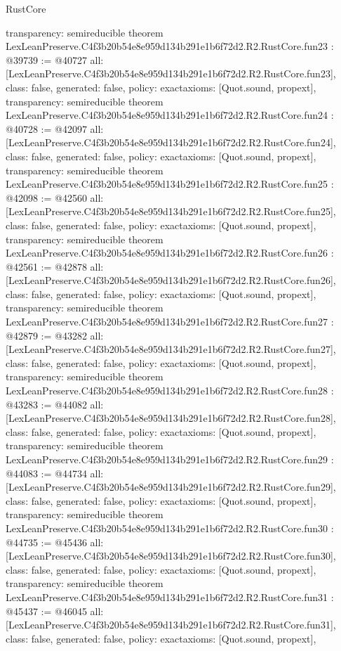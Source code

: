 \begin{lexlean}{RustCore}
\begin{coremodule}
{  transparency: semireducible
}
theorem LexLeanPreserve.C4f3b20b54e8e959d134b291e1b6f72d2.R2.RustCore.fun23 : @39739 := @40727 {
  all: [LexLeanPreserve.C4f3b20b54e8e959d134b291e1b6f72d2.R2.RustCore.fun23],
  class: false,
  generated: false,
  policy: exact{axioms: [Quot.sound, propext]},
  transparency: semireducible
}
theorem LexLeanPreserve.C4f3b20b54e8e959d134b291e1b6f72d2.R2.RustCore.fun24 : @40728 := @42097 {
  all: [LexLeanPreserve.C4f3b20b54e8e959d134b291e1b6f72d2.R2.RustCore.fun24],
  class: false,
  generated: false,
  policy: exact{axioms: [Quot.sound, propext]},
  transparency: semireducible
}
theorem LexLeanPreserve.C4f3b20b54e8e959d134b291e1b6f72d2.R2.RustCore.fun25 : @42098 := @42560 {
  all: [LexLeanPreserve.C4f3b20b54e8e959d134b291e1b6f72d2.R2.RustCore.fun25],
  class: false,
  generated: false,
  policy: exact{axioms: [Quot.sound, propext]},
  transparency: semireducible
}
theorem LexLeanPreserve.C4f3b20b54e8e959d134b291e1b6f72d2.R2.RustCore.fun26 : @42561 := @42878 {
  all: [LexLeanPreserve.C4f3b20b54e8e959d134b291e1b6f72d2.R2.RustCore.fun26],
  class: false,
  generated: false,
  policy: exact{axioms: [Quot.sound, propext]},
  transparency: semireducible
}
theorem LexLeanPreserve.C4f3b20b54e8e959d134b291e1b6f72d2.R2.RustCore.fun27 : @42879 := @43282 {
  all: [LexLeanPreserve.C4f3b20b54e8e959d134b291e1b6f72d2.R2.RustCore.fun27],
  class: false,
  generated: false,
  policy: exact{axioms: [Quot.sound, propext]},
  transparency: semireducible
}
theorem LexLeanPreserve.C4f3b20b54e8e959d134b291e1b6f72d2.R2.RustCore.fun28 : @43283 := @44082 {
  all: [LexLeanPreserve.C4f3b20b54e8e959d134b291e1b6f72d2.R2.RustCore.fun28],
  class: false,
  generated: false,
  policy: exact{axioms: [Quot.sound, propext]},
  transparency: semireducible
}
theorem LexLeanPreserve.C4f3b20b54e8e959d134b291e1b6f72d2.R2.RustCore.fun29 : @44083 := @44734 {
  all: [LexLeanPreserve.C4f3b20b54e8e959d134b291e1b6f72d2.R2.RustCore.fun29],
  class: false,
  generated: false,
  policy: exact{axioms: [Quot.sound, propext]},
  transparency: semireducible
}
theorem LexLeanPreserve.C4f3b20b54e8e959d134b291e1b6f72d2.R2.RustCore.fun30 : @44735 := @45436 {
  all: [LexLeanPreserve.C4f3b20b54e8e959d134b291e1b6f72d2.R2.RustCore.fun30],
  class: false,
  generated: false,
  policy: exact{axioms: [Quot.sound, propext]},
  transparency: semireducible
}
theorem LexLeanPreserve.C4f3b20b54e8e959d134b291e1b6f72d2.R2.RustCore.fun31 : @45437 := @46045 {
  all: [LexLeanPreserve.C4f3b20b54e8e959d134b291e1b6f72d2.R2.RustCore.fun31],
  class: false,
  generated: false,
  policy: exact{axioms: [Quot.sound, propext]},
}
\end{coremodule}
\end{lexlean}
